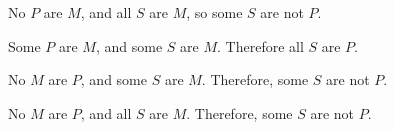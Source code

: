 \begin{exercises}

\item No $P$ are $M$, and all $S$ are $M$, so some $S$ are not $P$.

\item Some $P$ are $M$, and some $S$ are $M$. Therefore all $S$ are $P$.

\item No $M$ are $P$, and some $S$ are $M$. Therefore, some $S$ are not $P$.

\item  No $M$ are $P$, and all $S$ are $M$. Therefore, some $S$ are not $P$.
\end{exercises}
